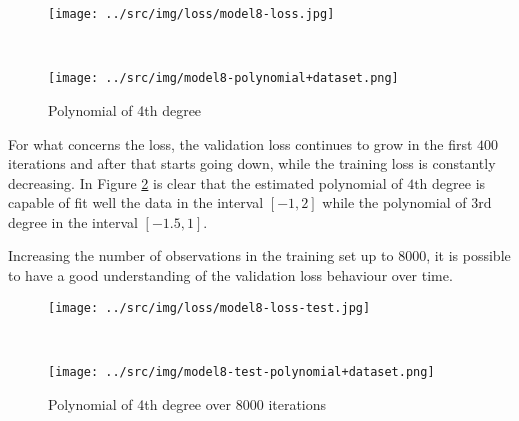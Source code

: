 \documentclass[a4paper,12pt]{article} %
\begin{document}
	\begin{figure}[H]
		\begin{minipage}[c]{.49\textwidth}
			\centering
			\texttt{[image: ../src/img/loss/model8-loss.jpg]}
		\end{minipage}
		~
		\begin{minipage}[c]{.49\textwidth}
			\centering
			\texttt{[image: ../src/img/model8-polynomial+dataset.png]}
		\end{minipage}
	\caption{Polynomial of 4th degree}
	\label{fig:model8}
	\end{figure}

	For what concerns the loss, the validation loss continues to grow in the 
	first $400$ iterations and after that starts going down, while the 
	training loss is constantly decreasing.
	In Figure \ref*{fig:model8-test} is clear that the estimated 
	polynomial of $4\mathrm{th}$ degree is capable of fit well the data in 
	the interval $[-1,2]$ while the polynomial of $3\mathrm{rd}$ degree 
	in the interval $[-1.5,1]$.\bigskip
	
	Increasing the number of observations in the training set up to $8000$, it 
	is possible to have a good understanding of the validation loss behaviour 
	over time. 
	
	\begin{figure}[H]
		\begin{minipage}[c]{.49\textwidth}
			\centering
			\texttt{[image: ../src/img/loss/model8-loss-test.jpg]}
		\end{minipage}
		~
		\begin{minipage}[c]{.49\textwidth}
			\centering
			\texttt{[image: ../src/img/model8-test-polynomial+dataset.png]}
		\end{minipage}
	\caption{Polynomial of 4th degree over $8000$ iterations}
	\label{fig:model8-test}
	\end{figure}
\end{document}
